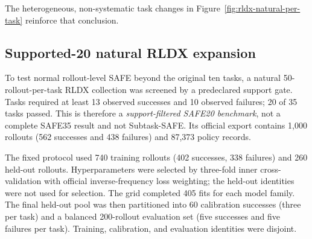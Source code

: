 \documentclass[11pt,a4paper]{article}
\begin{document}
The heterogeneous, non-systematic task changes in
Figure~\ref{fig:rldx-natural-per-task} reinforce that conclusion.

\subsection{Supported-20 natural RLDX expansion}
\label{sec:rldx-safe20}

To test normal rollout-level SAFE beyond the original ten tasks, a natural 50-rollout-per-task RLDX collection was screened by a predeclared support gate. Tasks required at least 13 observed successes and 10 observed failures; 20 of 35 tasks passed. This is therefore a \emph{support-filtered SAFE20 benchmark}, not a complete SAFE35 result and not Subtask-SAFE. Its official export contains 1,000 rollouts (562 successes and 438 failures) and 87,373 policy records.

The fixed protocol used 740 training rollouts (402 successes, 338 failures) and 260 held-out rollouts. Hyperparameters were selected by three-fold inner cross-validation with official inverse-frequency loss weighting; the held-out identities were not used for selection. The grid completed 405 fits for each model family. The final held-out pool was then partitioned into 60 calibration successes (three per task) and a balanced 200-rollout evaluation set (five successes and five failures per task). Training, calibration, and evaluation identities were disjoint.

\begin{table}[H]
\centering
\caption{SAFE20 model selection and discrimination. Raw metrics use all 260 held-out rollouts, whereas task-normalized metrics use the final 200-rollout evaluation partition; changes between the two columns are therefore descriptive rather than a strictly paired normalization effect.}
\label{tab:rldx-safe20-summary}
\end{table}
\end{document}
